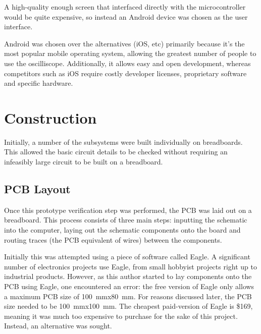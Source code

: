 A high-quality enough screen that interfaced directly with the microcontroller
would be quite expensive, so instead an Android device was chosen as the user
interface.

Android was chosen over the alternatives (iOS, etc) primarily because it's the
most popular mobile operating system, allowing the greatest number of people to
use the oscilliscope. Additionally, it allows easy and open development, whereas
competitors such as iOS require costly developer licenses, proprietary software
and specific hardware.


\section{Construction}
Initially, a number of the subsystems were built individually on breadboards.
This allowed the basic circuit details to be checked without requiring an
infeasibly large circuit to be built on a breadboard. 

\subsection{PCB Layout}
Once this prototype verification step was performed, the PCB was laid out on a
breadboard. This process consists of three main steps: inputting the schematic
into the computer, laying out the schematic components onto the board and
routing traces (the PCB equivalent of wires) between the components.

Initially this was attempted using a piece of software called Eagle. A
significant number of electronics projects use Eagle, from small hobbyist
projects right up to industrial products. However, as this author started to lay
components onto the PCB using Eagle, one encountered an error: the free version
of Eagle only allows a maximum PCB size of \SI{100}{\mm}x\SI{80}{\mm}. For
reasons discussed later, the PCB size needed to be \SI{100}{\mm}x\SI{100}{\mm}.
The cheapest paid-version of Eagle is \$169, meaning it was much too expensive
to purchase for the sake of this project. Instead, an alternative was sought.

